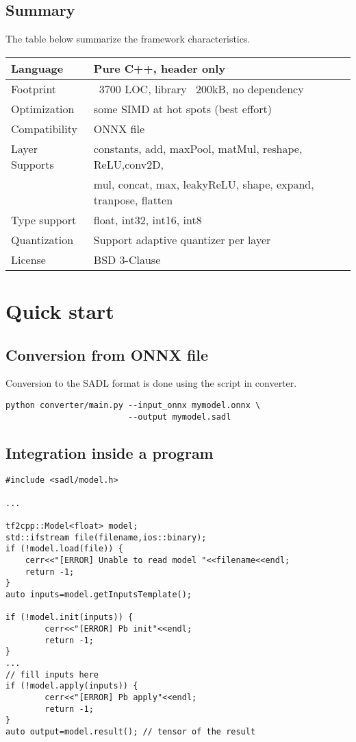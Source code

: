 \documentclass[10pt,a4paper]{article}
\begin{document}
\subsection{Summary}
The table below summarize the framework characteristics.
\begin{table}[]
\begin{tabular}{|l|l|}
\hline
Language & Pure C++, header only \\
\hline
Footprint & ~3700 LOC, library ~200kB, no dependency\\
\hline
Optimization & some SIMD at hot spots (best effort)\\
\hline
Compatibility & ONNX file\\
\hline
Layer Supports & constants, add, maxPool, matMul, reshape, ReLU,conv2D, \\
& mul, concat, max, leakyReLU, shape, expand, tranpose, flatten \\
\hline
Type support & float, int32, int16, int8\\
\hline
Quantization & Support adaptive quantizer per layer\\
\hline
License & BSD 3-Clause \\
\hline
\end{tabular}
\end{table}


\section{Quick start}
\subsection{Conversion from ONNX file}
Conversion to the SADL format is done using the script in converter.
\begin{lstlisting}[caption={SADL format conversion},style=code]
python converter/main.py --input_onnx mymodel.onnx \
                         --output mymodel.sadl
\end{lstlisting}

\subsection{Integration inside a program}
\begin{lstlisting}[caption={Model inference in C++},style=codec]
#include <sadl/model.h>

...

tf2cpp::Model<float> model;
std::ifstream file(filename,ios::binary);
if (!model.load(file)) {
    cerr<<"[ERROR] Unable to read model "<<filename<<endl;
    return -1;
}
auto inputs=model.getInputsTemplate();

if (!model.init(inputs)) {
        cerr<<"[ERROR] Pb init"<<endl;
        return -1;
}
...
// fill inputs here
if (!model.apply(inputs)) {
        cerr<<"[ERROR] Pb apply"<<endl;
        return -1;
}
auto output=model.result(); // tensor of the result
\end{lstlisting}
\end{document}
